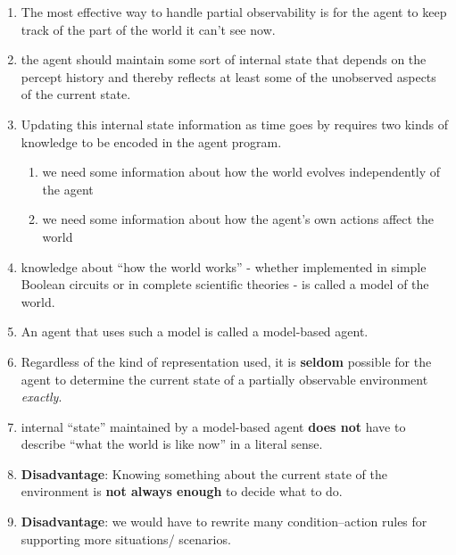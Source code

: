 \begin{enumerate}
    \item The most effective way to handle partial observability is for the agent to keep track of the part of the world it can’t see now.
    \hfill \cite{ai/book/Artificial-Intelligence-A-Modern-Approach/Russell-Norvig}

    \item the agent should maintain some sort of internal state that depends on the percept history and thereby reflects at least some of the unobserved aspects of the current state.
    \hfill \cite{ai/book/Artificial-Intelligence-A-Modern-Approach/Russell-Norvig}

    \item Updating this internal state information as time goes by requires two kinds of knowledge to be encoded in the agent program.
    \begin{enumerate}
        \item we need some information about how the world evolves independently of the agent
        \hfill \cite{ai/book/Artificial-Intelligence-A-Modern-Approach/Russell-Norvig}

        \item we need some information about how the agent’s own actions affect the world
        \hfill \cite{ai/book/Artificial-Intelligence-A-Modern-Approach/Russell-Norvig}
    \end{enumerate}

    \item knowledge about “how the world works” - whether implemented in simple Boolean circuits or in complete scientific theories - is called a model of the world.
    \hfill \cite{ai/book/Artificial-Intelligence-A-Modern-Approach/Russell-Norvig}

    \item An agent that uses such a model is called a model-based agent.
    \hfill \cite{ai/book/Artificial-Intelligence-A-Modern-Approach/Russell-Norvig}

    \item Regardless of the kind of representation used, it is \textbf{seldom} possible for the agent to determine the current state of a partially observable environment \textit{exactly}.
    \hfill \cite{ai/book/Artificial-Intelligence-A-Modern-Approach/Russell-Norvig}

    \item internal “state” maintained by a model-based agent \textbf{does not} have to describe “what the world is like now” in a literal sense.
    \hfill \cite{ai/book/Artificial-Intelligence-A-Modern-Approach/Russell-Norvig}

    \item \textbf{Disadvantage}: Knowing something about the current state of the environment is \textbf{not always enough} to decide what to do.
    \hfill \cite{ai/book/Artificial-Intelligence-A-Modern-Approach/Russell-Norvig}

    \item \textbf{Disadvantage}: we would have to rewrite many condition–action rules for supporting more situations/ scenarios.
\end{enumerate}



